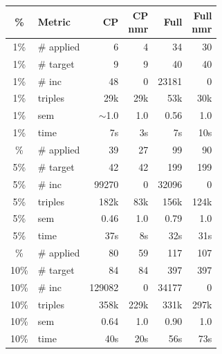 \documentclass[a4paper,UKenglish,cleveref, autoref, thm-restate]{tgdk-v2021}
\begin{document}
\begin{table}[]
\begin{minipage}[t]{0.49\linewidth}
\begin{tabular}{c l | r r r r}
\toprule
\% & Metric & CP & \shortstack{CP\\nmr} & Full & \shortstack{Full\\nmr} \\
\midrule
1\% & \# applied & 6 & 4 & 34 & 30 \\
1\% & \# target & 9 & 9 & 40 & 40 \\
1\% & \# inc & 48 & 0 & 23181 & 0 \\
1\% & triples & 29k & 29k & 53k & 30k \\
1\% & sem & $\sim$1.0 & 1.0 & 0.56 & 1.0 \\
1\% & time & 7s & 3s & 7s & 10s \\
\addlinespace
5\% & \# applied & 39 & 27 & 99 & 90 \\
5\% & \# target & 42 & 42 & 199 & 199 \\
5\% & \# inc & 99270 & 0 & 32096 & 0 \\
5\% & triples & 182k & 83k & 156k & 124k \\
5\% & sem & 0.46 & 1.0 & 0.79 & 1.0 \\
5\% & time & 37s & 8s & 32s & 31s \\
\addlinespace
10\% & \# applied & 80 & 59 & 117 & 107 \\
10\% & \# target & 84 & 84 & 397 & 397 \\
10\% & \# inc & 129082 & 0 & 34177 & 0 \\
10\% & triples & 358k & 229k & 331k & 297k \\
10\% & sem & 0.64 & 1.0 & 0.90 & 1.0 \\
10\% & time & 40s & 20s & 56s & 73s \\
\bottomrule
\end{tabular}
\end{minipage}\\[2ex]


\end{table}
\end{document}
